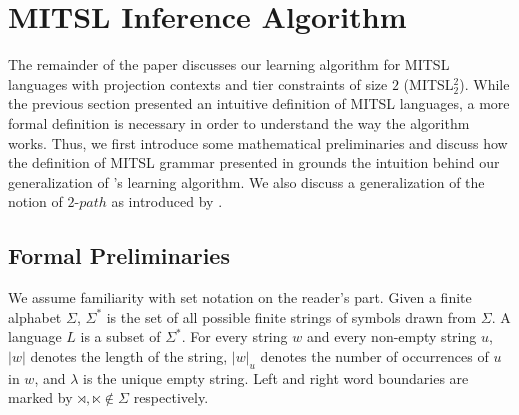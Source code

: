 \documentclass[11pt,a4paper]{article}
\begin{document}
%
%


\section{MITSL Inference Algorithm}

The remainder of the paper discusses our learning algorithm for MITSL languages with projection contexts and tier constraints of size $2$ (MITSL$^2_2$).
While the previous section presented an intuitive definition of MITSL languages, a more formal definition is necessary in order to understand the way the algorithm works.
Thus, we first introduce some mathematical preliminaries and discuss how the definition of MITSL grammar presented in \citep{desanto2019structure}  grounds the intuition behind our generalization of \citet{McMullinSCIL2019}'s learning algorithm. 
We also discuss a generalization of the notion of  $2\text{-}path$ as introduced by \citet{JardineHeinz16}.


\subsection{Formal Preliminaries}

We assume familiarity with set notation on the reader's part.
Given a finite alphabet $\Sigma$, $\Sigma^*$ is the set of all possible finite strings of symbols drawn from $\Sigma$. %
A language $L$ is a subset of $\Sigma^*$.
For every string $w$ and every non-empty string $u$, $|w|$ denotes the length of the string, $|w|_u$ denotes the number of occurrences of $u$ in $w$, and $\lambda$ is the unique empty string.
Left and right word boundaries are marked by  $\rtimes, \ltimes \notin \Sigma$ respectively.
\end{document}
